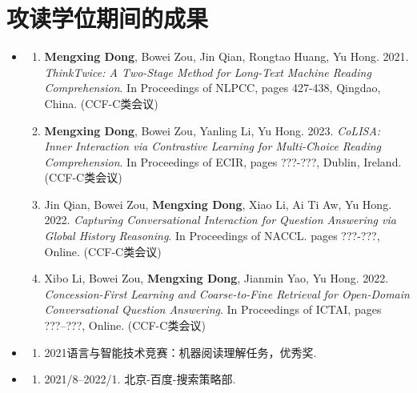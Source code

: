 \chapter{攻读学位期间的成果}

\begin{itemize}
	\setlength{\itemsep}{5pt}
	
	\item \textbf{\heiti{}}
	      \begin{enumerate}
	      	\setlength{\itemsep}{-\itemsep}  %
	      	
	      	\item \textbf{Mengxing Dong}, Bowei Zou, Jin Qian, Rongtao Huang, Yu Hong. 2021.
	      	      \emph{ThinkTwice: A Two-Stage Method for Long-Text Machine Reading Comprehension}.
	      	      In Proceedings of NLPCC, pages 427-438, Qingdao, China. (CCF-C类会议)
	      	      
	      	\item \textbf{Mengxing Dong}, Bowei Zou, Yanling Li, Yu Hong. 2023.
	      	      \emph{CoLISA: Inner Interaction via Contrastive Learning for Multi-Choice Reading Comprehension}.
	      	      In Proceedings of ECIR, pages ???-???, Dublin, Ireland. (CCF-C类会议)
	      	      
	      	\item Jin Qian, Bowei Zou, \textbf{Mengxing Dong}, Xiao Li, Ai Ti Aw, Yu Hong. 2022.
	      	      \emph{Capturing Conversational Interaction for Question Answering via Global History Reasoning}.
	      	      In Proceedings of NACCL. pages ???-???, Online. (CCF-C类会议)
	      	      
	      	\item Xibo Li, Bowei Zou, \textbf{Mengxing Dong}, Jianmin Yao, Yu Hong. 2022.
	      	      \emph{Concession-First Learning and Coarse-to-Fine Retrieval for Open-Domain Conversational Question Answering}.
                  In Proceedings of ICTAI, pages ???–???, Online. (CCF-C类会议)
	      	      
	      \end{enumerate}
	      
	\item \textbf{\heiti{}}
	      \begin{enumerate}
	      	\item 2021语言与智能技术竞赛：机器阅读理解任务，优秀奖.
	      \end{enumerate}
	      
	\item \textbf{\heiti{}}
	      \begin{enumerate}
	      	\item \textsc{2021/8--2022/1}. 北京-百度-搜索策略部.
	      \end{enumerate}
	      
\end{itemize}
